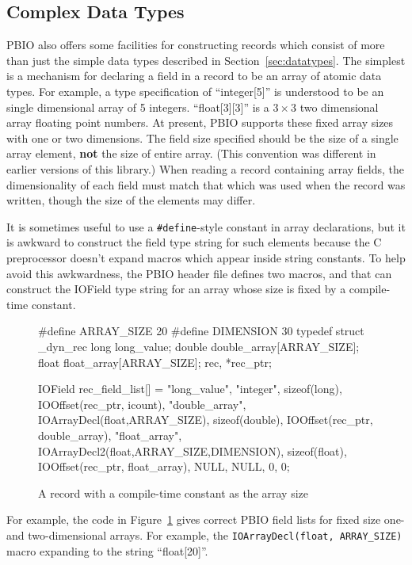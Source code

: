 \subsection{Complex Data Types}

PBIO also offers some facilities for constructing records which consist of
more than just the simple data types described in Section~\ref{sec:datatypes}.
The simplest is a mechanism for declaring a field in a record to be an array
of atomic data types.  For example, a type specification of ``integer[5]'' is
understood to be an single dimensional array of 5 integers.  ``float[3][3]''
is a $3\times 3$ two dimensional array floating point numbers.  At present,
PBIO supports these fixed array sizes with one or two dimensions.  The field
size specified should be the size of a single array element, {\bf not} the
size of entire array.  (This convention was different in earlier versions of
this library.)  When reading a record containing array fields, the
dimensionality of each field must match that which was used when the record
was written, though the size of the elements may differ.

It is sometimes useful to use a {\tt \#define}-style constant in array
declarations, but it is awkward to construct the field type string for such
elements because the C preprocessor doesn't expand macros which appear
inside string constants.  To help avoid this awkwardness, the PBIO header
file defines two macros,  and
 that can construct the IOField type string for an
array whose size is fixed by a compile-time constant.  
\begin{figure}[b]
\begin{WrapCode}
#define ARRAY_SIZE 20
#define DIMENSION  30
typedef struct _dyn_rec {
    long        long_value;
    double      double_array[ARRAY_SIZE];
    float      float_array[ARRAY_SIZE];
} rec, *rec_ptr;

IOField rec_field_list[] = {
    {"long_value", "integer", sizeof(long), IOOffset(rec_ptr, icount)},
    {"double_array", IOArrayDecl(float,ARRAY_SIZE), sizeof(double), IOOffset(rec_ptr, double_array)},
    {"float_array", IOArrayDecl2(float,ARRAY_SIZE,DIMENSION), sizeof(float), IOOffset(rec_ptr, float_array)},
    { NULL, NULL, 0, 0}};
\end{WrapCode}
\caption{A record with a compile-time constant as the array size\label{fig:fixarray}}
\end{figure}
For example, the code
in Figure~\ref{fig:fixarray} gives correct PBIO field lists for fixed size
one- and two-dimensional arrays.  For example, the {\tt IOArrayDecl(float,
ARRAY\_SIZE)} macro expanding to the string ``float[20]''.



